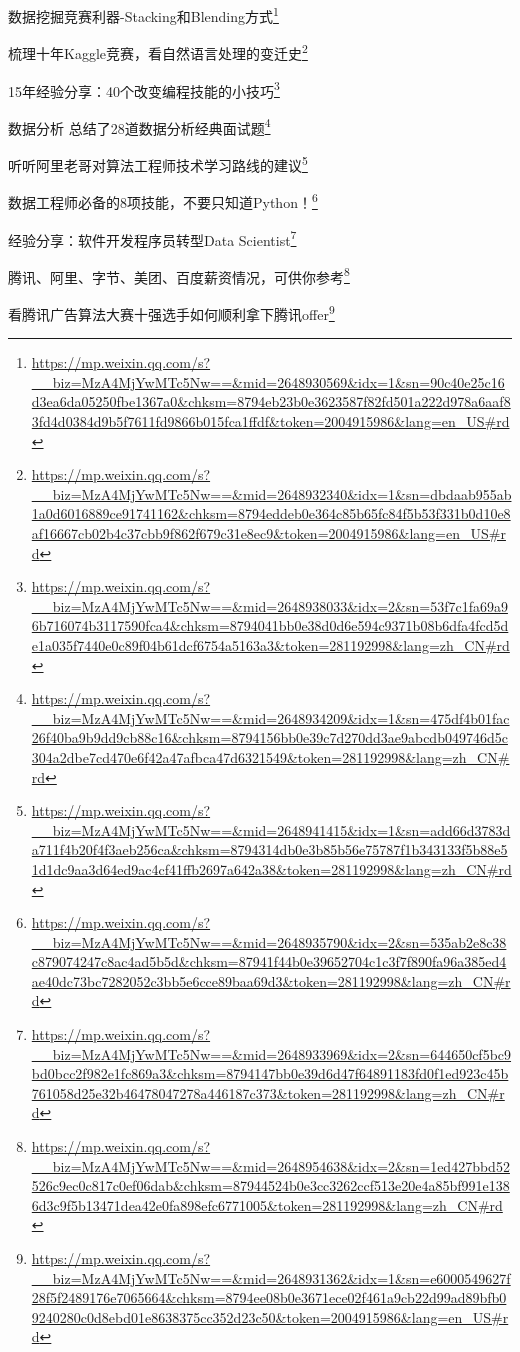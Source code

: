 \documentclass[]{ctexbook}
\renewcommand{\href}[2]{#2\footnote{\url{#1}}}
\begin{document}
\href{https://mp.weixin.qq.com/s?__biz=MzA4MjYwMTc5Nw==\&mid=2648930569\&idx=1\&sn=90c40e25c16d3ea6da05250fbe1367a0\&chksm=8794eb23b0e3623587f82fd501a222d978a6aaf83fd4d0384d9b5f7611fd9866b015fca1ffdf\&token=2004915986\&lang=en_US\#rd}{数据挖掘竞赛利器-Stacking和Blending方式}

\href{https://mp.weixin.qq.com/s?__biz=MzA4MjYwMTc5Nw==\&mid=2648932340\&idx=1\&sn=dbdaab955ab1a0d6016889ce91741162\&chksm=8794eddeb0e364c85b65fc84f5b53f331b0d10e8af16667cb02b4c37cbb9f862f679c31e8ec9\&token=2004915986\&lang=en_US\#rd}{梳理十年Kaggle竞赛，看自然语言处理的变迁史}

\href{https://mp.weixin.qq.com/s?__biz=MzA4MjYwMTc5Nw==\&mid=2648938033\&idx=2\&sn=53f7c1fa69a96b716074b3117590fca4\&chksm=8794041bb0e38d0d6e594c9371b08b6dfa4fcd5de1a035f7440e0c89f04b61dcf6754a5163a3\&token=281192998\&lang=zh_CN\#rd}{15年经验分享：40个改变编程技能的小技巧}

\href{https://mp.weixin.qq.com/s?__biz=MzA4MjYwMTc5Nw==\&mid=2648934209\&idx=1\&sn=475df4b01fac26f40ba9b9dd9cb88c16\&chksm=8794156bb0e39c7d270dd3ae9abcdb049746d5c304a2dbe7cd470e6f42a47afbca47d6321549\&token=281192998\&lang=zh_CN\#rd}{数据分析 \textbar{} 总结了28道数据分析经典面试题}

\href{https://mp.weixin.qq.com/s?__biz=MzA4MjYwMTc5Nw==\&mid=2648941415\&idx=1\&sn=add66d3783da711f4b20f4f3aeb256ca\&chksm=8794314db0e3b85b56e75787f1b343133f5b88e51d1dc9aa3d64ed9ac4cf41ffb2697a642a38\&token=281192998\&lang=zh_CN\#rd}{听听阿里老哥对算法工程师技术学习路线的建议}

\href{https://mp.weixin.qq.com/s?__biz=MzA4MjYwMTc5Nw==\&mid=2648935790\&idx=2\&sn=535ab2e8c38c879074247c8ac4ad5b5d\&chksm=87941f44b0e39652704c1c3f7f890fa96a385ed4ae40dc73bc7282052c3bb5e6cce89baa69d3\&token=281192998\&lang=zh_CN\#rd}{数据工程师必备的8项技能，不要只知道Python！}

\href{https://mp.weixin.qq.com/s?__biz=MzA4MjYwMTc5Nw==\&mid=2648933969\&idx=2\&sn=644650cf5bc9bd0bcc2f982e1fc869a3\&chksm=8794147bb0e39d6d47f64891183fd0f1ed923c45b761058d25e32b46478047278a446187c373\&token=281192998\&lang=zh_CN\#rd}{经验分享：软件开发程序员转型Data Scientist}

\href{https://mp.weixin.qq.com/s?__biz=MzA4MjYwMTc5Nw==\&mid=2648954638\&idx=2\&sn=1ed427bbd52526c9ec0c817c0ef06dab\&chksm=87944524b0e3cc3262ccf513e20e4a85bf991e1386d3c9f5b13471dea42e0fa898efc6771005\&token=281192998\&lang=zh_CN\#rd}{腾讯、阿里、字节、美团、百度薪资情况，可供你参考}

\href{https://mp.weixin.qq.com/s?__biz=MzA4MjYwMTc5Nw==\&mid=2648931362\&idx=1\&sn=e6000549627f28f5f2489176e7065664\&chksm=8794ee08b0e3671ece02f461a9cb22d99ad89bfb09240280c0d8ebd01e8638375cc352d23c50\&token=2004915986\&lang=en_US\#rd}{看腾讯广告算法大赛十强选手如何顺利拿下腾讯offer}
\end{document}

